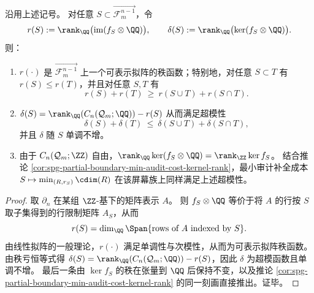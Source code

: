 \begin{theorem}[可见秩函数的可表示拟阵性与审计缺口的超模性]\label{thm:spg-screen-rank-matroid-supermodularity}
沿用上述记号。
对任意 \(S\subset \overrightarrow{\mathcal F_{m}^{n-1}}\)，令
\[
r(S):=\rank_{\QQ}\bigl(\mathrm{im}(f_S\otimes\QQ)\bigr),
\qquad
\delta(S):=\rank_{\QQ}\bigl(\ker(f_S\otimes\QQ)\bigr).
\]
则：
\begin{enumerate}
  \item \(r(\cdot)\) 是 \(\overrightarrow{\mathcal F_{m}^{n-1}}\) 上一个可表示拟阵的秩函数；特别地，对任意 \(S\subset T\) 有 \(r(S)\le r(T)\)，并且对任意 \(S,T\) 有
        \[
        r(S)+r(T)\ \ge\ r(S\cup T)+r(S\cap T).
        \]
  \item \(\delta(S)=\rank_{\QQ}(C_n(\mathcal Q_m;\QQ)) - r(S)\) 从而满足超模性
        \[
        \delta(S)+\delta(T)\ \le\ \delta(S\cup T)+\delta(S\cap T),
        \]
        并且 \(\delta\) 随 \(S\) 单调不增。
  \item 由于 \(C_n(\mathcal Q_m;\ZZ)\) 自由，\(\rank_{\QQ}\ker(f_S\otimes\QQ)=\rank_{\ZZ}\ker f_S\)。
        结合推论 \ref{cor:spg-partial-boundary-min-audit-cost-kernel-rank}，最小审计补全成本 \(S\mapsto \min_{(R,r_S)}\cdim(R)\) 在该屏幕族上同样满足上述超模性。
\end{enumerate}
\end{theorem}
\begin{proof}
取 \(\partial_n\) 在某组 \(\ZZ\)-基下的矩阵表示 \(A\)。
则 \(f_S\otimes\QQ\) 等价于将 \(A\) 的行按 \(S\) 取子集得到的行限制矩阵 \(A_S\)，从而
\[
r(S)=\dim_{\QQ}\Span\{\text{rows of }A\text{ indexed by }S\}.
\]
由线性拟阵的一般理论，\(r(\cdot)\) 满足单调性与次模性，从而为可表示拟阵秩函数。
由秩亏恒等式得 \(\delta(S)=\rank_{\QQ}(C_n(\mathcal Q_m;\QQ))-r(S)\)，因此 \(\delta\) 为超模函数且单调不增。
最后一条由 \(\ker f_S\) 的秩在张量到 \(\QQ\) 后保持不变，以及推论 \ref{cor:spg-partial-boundary-min-audit-cost-kernel-rank} 的同一刻画直接推出。证毕。
\end{proof}



\endinput
